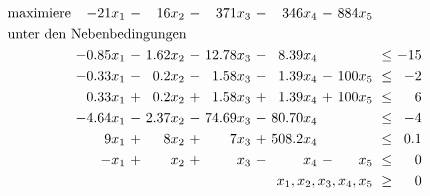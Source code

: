 \documentclass [a4paper,11pt]{article}
\begin{document}
\begin{enumerate}
\begin{enumerate}


                    \begin{align*}
                    \begin{alignedat}{7}
                    & \text{maximiere } & -21x_1 &\ - &\ 16x_2 &\ - &\ 371x_3 &\ - &\ 346x_4 &\ - &\ 884x_5 & & \\
                    & \rlap{unter den Nebenbedingungen} & & & & & & & & & & & \\
                    &&-0.85x_1 &\ - &\ 1.62x_2 &\ - &\ 12.78x_3 &\ - &\  8.39x_4 &    &         &\ \leq &\ -15 \\
                    &&-0.33x_1 &\ - &\  0.2x_2 &\ - &\  1.58x_3 &\ - &\  1.39x_4 &\ - &\ 100x_5 &\ \leq &\  -2 \\
                    && 0.33x_1 &\ + &\  0.2x_2 &\ + &\  1.58x_3 &\ + &\  1.39x_4 &\ + &\ 100x_5 &\ \leq &\   6 \\
                    &&-4.64x_1 &\ - &\ 2.37x_2 &\ - &\ 74.69x_3 &\ - &\ 80.70x_4 &    &         &\ \leq &\  -4 \\
                    &&    9x_1 &\ + &\    8x_2 &\ + &\     7x_3 &\ + &\ 508.2x_4 &    &         &\ \leq &\ 0.1 \\
                    &&    -x_1 &\ + &\     x_2 &\ + &\      x_3 &\ - &\      x_4 &\ - &\    x_5 &\ \leq &\   0 \\
                    && & & & & & & & & \llap{$x_1, x_2, x_3, x_4, x_5$} &\ \geq &\ 0
                    \end{alignedat}
                    \end{align*}
		\end{enumerate}
            
            

    \end{enumerate}
\end{document}
